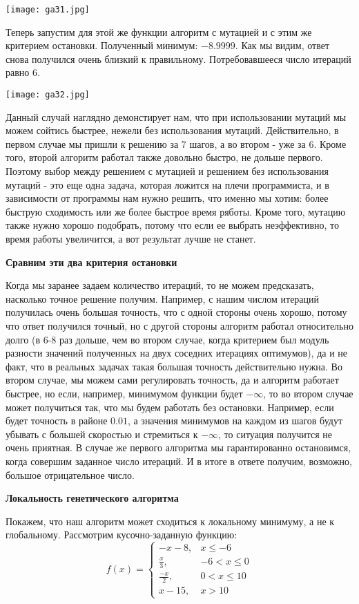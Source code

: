 \documentclass[a4paper,11pt,russian]{article}
\begin{document}
{\texttt{[image: ga31.jpg]}}

Теперь запустим для этой же функции алгоритм с мутацией и с этим же критерием остановки. Полученный минимум:  $-8.9999$. Как мы видим, ответ снова получился очень близкий к правильному. Потребовавшееся число итераций равно $6$.

{\texttt{[image: ga32.jpg]}}

Данный случай наглядно демонстирует нам, что при использовании мутаций мы можем сойтись быстрее, нежели без использования мутаций. Действительно, в первом случае мы пришли к решению за 7 шагов, а во втором - уже за 6. Кроме того, второй алгоритм работал также довольно быстро, не дольше первого. Поэтому выбор между решением с мутацией и решением без использования мутаций - это еще одна задача, которая ложится на плечи программиста, и в зависимости от программы нам нужно решить, что именно мы хотим: более быструю сходимость или же более быстрое время ряботы. Кроме того, мутацию также нужно хорошо подобрать, потому что если ее выбрать неэффективно, то время работы увеличится, а вот результат лучше не станет.


\textbf{Сравним эти два критерия остановки}

Когда мы заранее задаем количество итераций, то не можем предсказать, насколько точное решение получим. Например, с нашим числом итераций получилась очень большая точность, что с одной стороны очень хорошо, потому что ответ получился точный, но с другой стороны алгоритм работал относительно долго (в 6-8 раз дольше, чем во втором случае, когда критерием был модуль разности значений полученных на двух соседних итерациях оптимумов), да и не факт, что в реальных задачах такая большая точность действительно нужна. Во втором случае, мы можем сами регулировать точность, да и алгоритм работает быстрее, но если, например, минимумом функции будет $- \infty$, то во втором случае может получиться так, что мы будем работать без остановки. Например, если будет точность в районе $0.01$, а значения минимумов на каждом из шагов будут убывать с большей скоростью и стремиться к $- \infty$, то ситуация получится не очень приятная. В случае же первого алгоритма мы гарантированно остановимся, когда совершим заданное число итераций. И в итоге в ответе получим, возможно, большое отрицательное число.

\hfill \break
\textbf{Локальность генетического алгоритма}

Покажем, что наш алгоритм может сходиться к локальному минимуму, а не к глобальному. Рассмотрим кусочно-заданную функцию: 
\begin{equation}
f(x) = 
 \begin{cases}
   -x-8, &\text{$x \leq -6$}\\
    \frac{x}{3}, &\text{$-6 < x \leq 0$}\\
    \frac{-x}{2}, &\text{$0 < x \leq 10$}\\
    x-15, &\text{$x>10$}
 \end{cases}
\end{equation}
\end{document}
